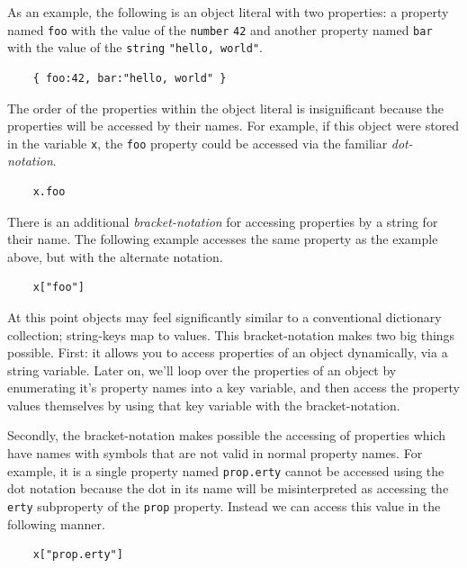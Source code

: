 \documentclass[11pt,letter]{book}
\begin{document}
    As an example, the following is an object literal with two properties: a property named 
    \texttt{foo} with the value of the \texttt{number} \texttt{42} and another property named 
    \texttt{bar} with the value of the \texttt{string} \texttt{"hello, world"}.
    
    \begin{verbatim}
    { foo:42, bar:"hello, world" }
    \end{verbatim}
    
    The order of the properties within the object literal is insignificant because the properties
    will be accessed by their names. For example, if this object were stored in the variable 
    \texttt{x}, the \texttt{foo} property could be accessed via the familiar \emph{dot-notation}.
    
    \begin{verbatim}
    x.foo
    \end{verbatim}
    
    There is an additional \emph{bracket-notation} for accessing properties by a string for their 
    name. The following example accesses the same property as the example above, but with the 
    alternate notation.
    
    \begin{verbatim}
    x["foo"]
    \end{verbatim}
    
    At this point objects may feel significantly similar to a conventional dictionary collection;
    string-keys map to values. This bracket-notation makes two big things possible. First: it allows 
    you to access properties of an object dynamically, via a string variable. Later on, we'll loop
    over the properties of an object by enumerating it's property names into a key variable, and 
    then access the property values themselves by using that key variable with the bracket-notation.
    
    Secondly, the bracket-notation makes possible the accessing of properties which have names with 
    symbols that are not valid in normal property names. For example, it is a single property named 
    \texttt{prop.erty} cannot be accessed using the dot notation because the dot in its name will be
    misinterpreted as accessing the \texttt{erty} subproperty of the \texttt{prop} property. Instead
    we can access this value in the following manner.
    
    \begin{verbatim}
    x["prop.erty"]
    \end{verbatim}
    
\end{document}
